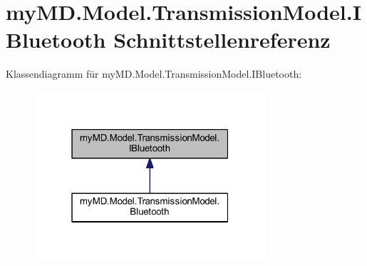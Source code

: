 \hypertarget{interfacemy_m_d_1_1_model_1_1_transmission_model_1_1_i_bluetooth}{}\section{my\+M\+D.\+Model.\+Transmission\+Model.\+I\+Bluetooth Schnittstellenreferenz}
\label{interfacemy_m_d_1_1_model_1_1_transmission_model_1_1_i_bluetooth}


Klassendiagramm für my\+M\+D.\+Model.\+Transmission\+Model.\+I\+Bluetooth\+:\nopagebreak
\begin{figure}[H]
\begin{center}
\leavevmode
\includegraphics[width=244pt]{interfacemy_m_d_1_1_model_1_1_transmission_model_1_1_i_bluetooth__inherit__graph}
\end{center}
\end{figure}
